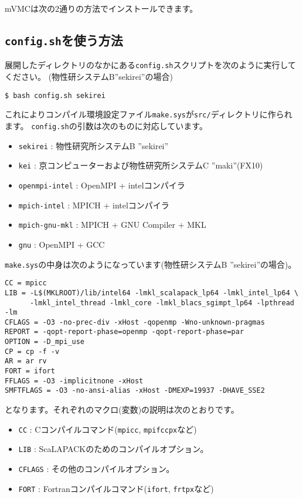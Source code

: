 mVMCは次の2通りの方法でインストールできます。

\subsection{\texttt{config.sh}を使う方法}

展開したディレクトリのなかにある\verb|config.sh|スクリプトを次のように実行してください。
(物性研システムB''sekirei''の場合)
\begin{verbatim}
$ bash config.sh sekirei
\end{verbatim}
これによりコンパイル環境設定ファイル\verb|make.sys|が\verb|src/|ディレクトリに作られます。
\verb|config.sh|の引数は次のものに対応しています。
\begin{itemize}
\item \verb|sekirei| : 物性研究所システムB ''sekirei''
\item \verb|kei| : 京コンピューターおよび物性研究所システムC ''maki''(FX10)
\item \verb|openmpi-intel| : OpenMPI + intelコンパイラ
\item \verb|mpich-intel| : MPICH + intelコンパイラ
\item \verb|mpich-gnu-mkl| : MPICH + GNU Compiler + MKL
\item \verb|gnu| :  OpenMPI + GCC
\end{itemize}

\verb|make.sys|の中身は次のようになっています(物性研システムB ''sekirei''の場合)。
\begin{verbatim}
CC = mpicc
LIB = -L$(MKLROOT)/lib/intel64 -lmkl_scalapack_lp64 -lmkl_intel_lp64 \
      -lmkl_intel_thread -lmkl_core -lmkl_blacs_sgimpt_lp64 -lpthread -lm
CFLAGS = -O3 -no-prec-div -xHost -qopenmp -Wno-unknown-pragmas
REPORT = -qopt-report-phase=openmp -qopt-report-phase=par
OPTION = -D_mpi_use
CP = cp -f -v
AR = ar rv
FORT = ifort
FFLAGS = -O3 -implicitnone -xHost
SMFTFLAGS = -O3 -no-ansi-alias -xHost -DMEXP=19937 -DHAVE_SSE2
\end{verbatim}
となります。それぞれのマクロ(変数)の説明は次のとおりです。
\begin{itemize}
\item \verb|CC| : Cコンパイルコマンド(\verb|mpicc|, \verb|mpifccpx|など)
\item \verb|LIB| : ScaLAPACKのためのコンパイルオプション。
\item \verb|CFLAGS| : その他のコンパイルオプション。
\item \verb|FORT| : Fortranコンパイルコマンド(\verb|ifort|, \verb|frtpx|など)
\end{itemize}

